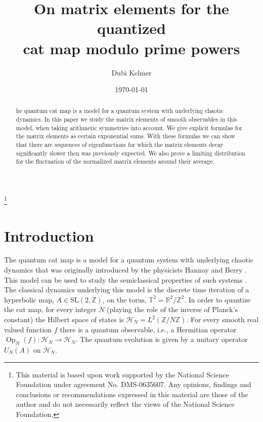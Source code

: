 \documentclass[12pt]{amsart}
\theoremstyle{definition}
\theoremstyle{remark}
\numberwithin{equation}{section}
\newcommand{\bbZ}{\mathbb{Z}}
\newcommand{\bbR}{\mathbb R}
\newcommand{\bbT}{\mathbb{T}}
\newcommand{\Op}{ \operatorname{Op}}
\newcommand{\SL}{ \mathrm{SL}}
\newcommand{\calH}{\mathcal{H}}
\begin{document}
\title[cat map modulo prime powers]
{On matrix elements for the quantized\\ cat map modulo prime powers}%
\author{Dubi Kelmer }%
\address{School of Mathematics,
Institute for Advanced Study, 1 Einstein Drive , Princeton, New Jersey 08540 US}


\thanks{
This material is based upon work supported by the National Science Foundation under agreement No. DMS-0635607. Any opinions, findings and conclusions or recommendations expressed in this material are those of the author and do not necessarily reflect the views of the National Science Foundation.}%
\subjclass{}%
\keywords{}%

\date{\today}%
\dedicatory{}%
\commby{}%

\begin{abstract}
he quantum cat map is a model for a quantum system with underlying
chaotic dynamics. In this paper we study the matrix elements of
smooth observables in this model, when taking arithmetic symmetries
into account. We give explicit formulas for the matrix elements as
certain exponential sums. With these formulas we can show that there
are sequences of eigenfunctions for which the matrix elements decay
significantly slower then was previously expected. We also prove a
limiting distribution for the fluctuation of the normalized matrix
elements around their average.
\end{abstract}
\maketitle

\section{Introduction}
The quantum cat map is a model for a quantum system with underlying
chaotic dynamics that was originally introduced by the physicists
Hannay and Berry  \cite{HannayBerry80}. This model can be used to
study the semiclassical properties of such systems
\cite{BonechiDebievre,FaureNonnenmacherDeBievre03,KurRud2000,KurRud05}.
The classical dynamics underlying this model is the discrete time
iteration of a hyperbolic map, $A\in\SL(2,\bbZ)$, on the torus,
$\bbT^2=\bbR^2/\bbZ^2$. In order to quantize the cat map, for every
integer $N$ (playing the role of the inverse of Planck's constant)
the Hilbert space of states is $\calH_N=L^2(\bbZ/N\bbZ)$. For every
smooth real valued function $f$ there is a quantum observable, i.e.,
a Hermitian operator $\Op_N(f):\calH_N\to\calH_N$. The quantum
evolution is given by a unitary operator $U_N(A)$ on $\calH_N$.
\end{document}

